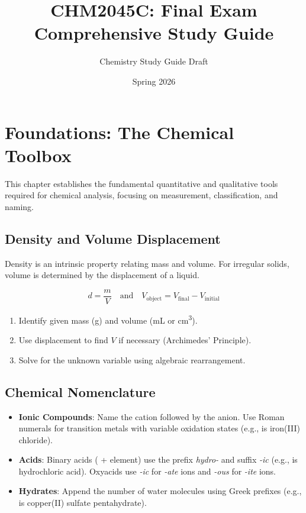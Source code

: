 \documentclass[11pt]{article}
\begin{document}
\title{CHM2045C: Final Exam Comprehensive Study Guide}
\author{Chemistry Study Guide Draft}
\date{Spring 2026}
\maketitle

\section{Foundations: The Chemical Toolbox}

This chapter establishes the fundamental quantitative and qualitative tools required for chemical analysis, focusing on measurement, classification, and naming.

\subsection{Density and Volume Displacement}
Density is an intrinsic property relating mass and volume. For irregular solids, volume is determined by the displacement of a liquid.
\begin{tcolorbox}[memorize]
    \[ d = \frac{m}{V} \quad \text{and} \quad V_{\text{object}} = V_{\text{final}} - V_{\text{initial}} \]
\end{tcolorbox}
\begin{enumerate}
    \item Identify given mass (\si{\gram}) and volume (\si{\milli\liter} or \si{\centi\meter^3}).
    \item Use displacement to find $V$ if necessary (Archimedes' Principle).
    \item Solve for the unknown variable using algebraic rearrangement.
\end{enumerate}

\subsection{Chemical Nomenclature}
\begin{itemize}
    \item \textbf{Ionic Compounds}: Name the cation followed by the anion. Use Roman numerals for transition metals with variable oxidation states (e.g.,  is iron(III) chloride).
    \item \textbf{Acids}: Binary acids ( + element) use the prefix \textit{hydro-} and suffix \textit{-ic} (e.g.,  is hydrochloric acid). Oxyacids use \textit{-ic} for \textit{-ate} ions and \textit{-ous} for \textit{-ite} ions.
    \item \textbf{Hydrates}: Append the number of water molecules using Greek prefixes (e.g.,  is copper(II) sulfate pentahydrate).
\end{itemize}
\end{document}
